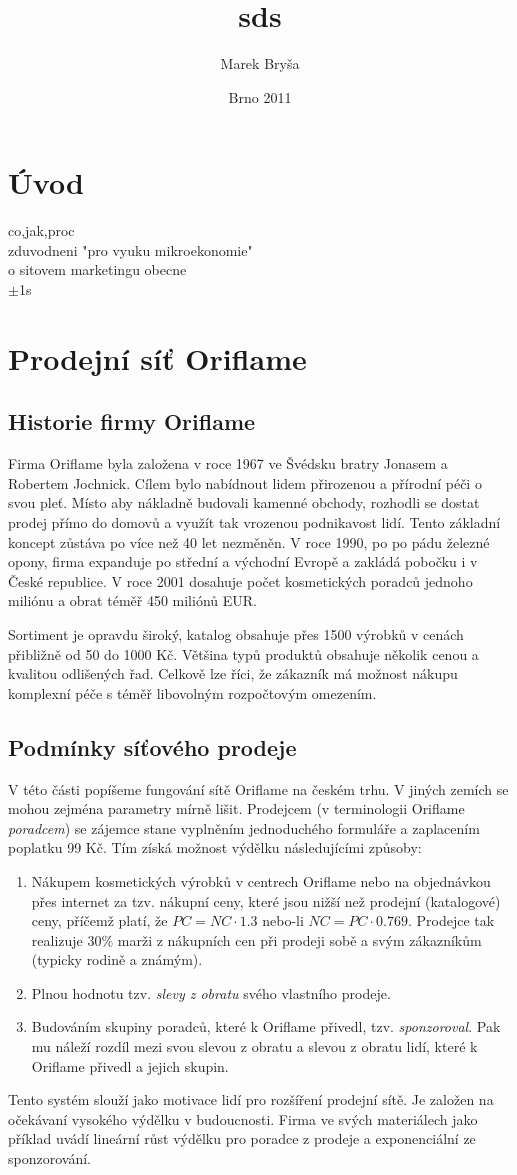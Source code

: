 \documentclass[a4wide,12pt]{report}
\title{sds}
\author{Marek Bryša}
\date{Brno 2011}
\begin{document}
\tableofcontents

\chapter*{Úvod}
co,jak,proc\\
zduvodneni "pro vyuku mikroekonomie"\\
o sitovem marketingu obecne\\
$\pm$1s
\chapter{Prodejní síť Oriflame}
\section{Historie firmy Oriflame}
Firma Oriflame byla založena v roce 1967 ve Švédsku bratry Jonasem a Robertem Jochnick. Cílem bylo nabídnout lidem přirozenou a přírodní péči o svou pleť. Místo aby nákladně budovali kamenné obchody, rozhodli se dostat prodej přímo do domovů a využít tak vrozenou podnikavost lidí. Tento základní koncept zůstáva po více než 40 let nezměněn. V roce 1990, po po pádu železné opony, firma expanduje po střední a východní Evropě a zakládá pobočku i v České republice. V roce 2001 dosahuje počet kosmetických poradců jednoho miliónu a obrat téměř 450 miliónů EUR.

Sortiment je opravdu široký, katalog obsahuje přes 1500 výrobků v cenách přibližně od 50 do 1000 Kč. Většina typů produktů obsahuje několik cenou a kvalitou odlišených řad. Celkově lze říci, že zákazník má možnost nákupu komplexní péče s téměř libovolným rozpočtovým omezením.
\section{Podmínky síťového prodeje}
V této části popíšeme fungování sítě Oriflame na českém trhu. V jiných zemích se mohou zejména parametry mírně lišit. Prodejcem (v terminologii Oriflame \emph{poradcem}) se zájemce stane vyplněním jednoduchého formuláře a zaplacením poplatku 99 Kč. Tím získá možnost výdělku následujícími způsoby:
\begin{enumerate}
\item Nákupem kosmetických výrobků v centrech Oriflame nebo na objednávkou přes internet za tzv. nákupní ceny, které jsou nižší než prodejní (katalogové) ceny, příčemž platí, že $PC=NC \cdot 1.3$ nebo-li $NC = PC \cdot 0.769$. Prodejce tak realizuje 30\% marži z nákupních cen při prodeji sobě a svým zákazníkům (typicky rodině a známým).
\item Plnou hodnotu tzv. \emph{slevy z obratu} svého vlastního prodeje.
\item Budováním skupiny poradců, které k Oriflame přivedl, tzv. \emph{sponzoroval}. Pak mu náleží rozdíl mezi svou slevou z obratu a slevou z obratu lidí, které k Oriflame přivedl a jejich skupin.
\end{enumerate}
Tento systém slouží jako motivace lidí pro rozšíření prodejní sítě. Je založen na očekávaní vysokého výdělku v budoucnosti. Firma ve svých materiálech jako příklad uvádí lineární růst výdělku pro poradce z prodeje a exponenciální ze sponzorování.
\end{document}
